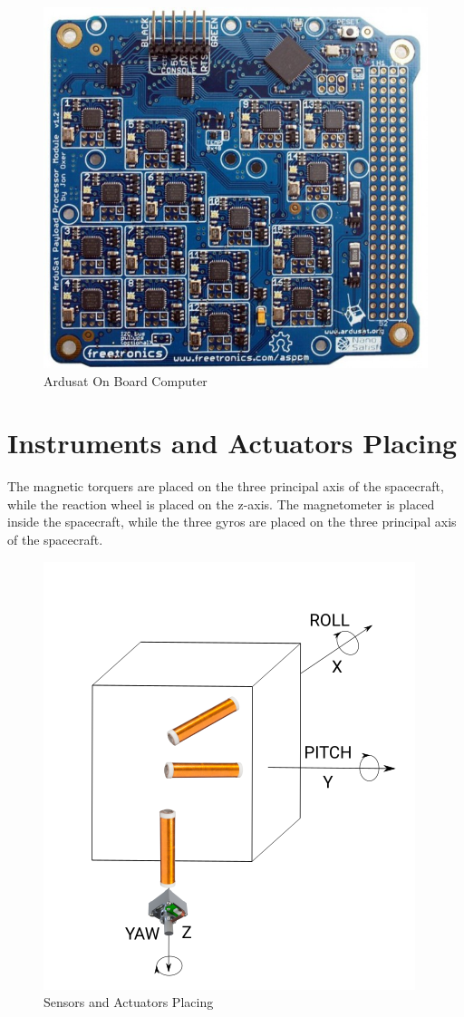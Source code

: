 \documentclass[11pt,a4paper]{report}
\begin{document}
\begin{figure}[H]
 	\centering
 	\includegraphics[scale=0.25]{gfx/ardusat.jpg}
    \caption{Ardusat On Board Computer}
\end{figure}

\section{Instruments and Actuators Placing}
The magnetic torquers are placed on the three principal axis of the spacecraft, while the reaction wheel is placed on the z-axis. The magnetometer is placed inside the spacecraft, while the three gyros are placed on the three principal axis of the spacecraft.

\begin{figure}[H]
 	\centering
 	\includegraphics[scale=0.4]{gfx/actuators.png}
    \caption{Sensors and Actuators Placing}
\end{figure}
\end{document}
